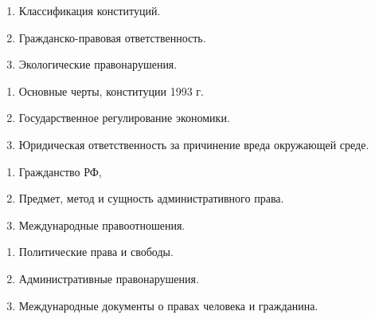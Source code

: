 \newpage


\shapkFull
\setcounter{zad}{0}

\begin{enumerate}
	\item Классификация конституций.

	\item Гражданско-правовая ответственность.

	\item Экологические  правонарушения.

\end{enumerate}

\newpage


\shapkFull
\setcounter{zad}{0}

\begin{enumerate}
	\item Основные черты,  конституции 1993 г.

	\item Государственное регулирование экономики.

	\item Юридическая ответственность за причинение вреда окружающей   среде.

\end{enumerate}

\newpage


\shapkFull
\setcounter{zad}{0}

\begin{enumerate}
	\item Гражданство РФ,

	\item Предмет, метод и сущность административного права.

	\item Международные правоотношения.                

\end{enumerate}

\newpage


\shapkFull
\setcounter{zad}{0}

\begin{enumerate}
	\item Политические права и свободы.

	\item Административные правонарушения.

	\item Международные документы о правах человека и гражданина.

\end{enumerate}

